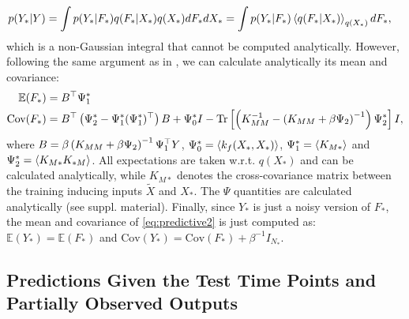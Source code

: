 \documentclass{article} %
\begin{document}
\begin{align} 
p(Y_*| Y) {}& =  \int p(Y_*| F_*)  q(F_*|X_*) q(X_*) d F_* d X_* = \int p(Y_* | F_*) \left\langle q(F_* | X_*) \right\rangle_{q(X_*)} d F_* , \label{eq:predictive2}
\end{align}
%
which is a non-Gaussian integral that cannot be computed analytically. However, following the same argument as in \cite{rasmussen-williams, Girard03gaussianprocess}, we can
calculate analytically its mean and covariance:
%
\begin{align}
 \mathbb{E}(F_*) ={}&  B^{\top} \Psi_1^* \label{meanFstar} \\
 \text{Cov}(F_*) ={}& B^{\top} \left( \Psi_2^* - \Psi_1^* (\Psi_1^*)^{\top} \right) B + \Psi_0^* I - \text{Tr} \left[ \left( K_{MM}^{-1} - \left( K_{MM} + \beta \Psi_2 \right)^{-1} \right) \Psi_2^* \right] I,
\end{align}
%
where $B = \beta \left( K_{MM} + \beta \Psi_2 \right)^{-1} \Psi_1^{\top}
Y$, $\Psi_0^* = \left\langle k_f(X_*, X_*) \right\rangle$, $\Psi_1^* = \left\langle K_{M*} \right\rangle$
and $\Psi_2^* = \left\langle K_{M*} K_{*M} \right\rangle$. All expectations are taken
w.r.t. $q(X_*)$ and can be calculated analytically, while $K_{M*}$
denotes the cross-covariance matrix between the training inducing
inputs $\tilde{X}$ and $X_*$. The $\Psi$ quantities are calculated analytically (see suppl. material). Finally, since $Y_*$ is just a noisy version of
$F_*$, the mean and covariance of \eqref{eq:predictive2} is just
computed as: $\mathbb{E}(Y_*) = \mathbb{E}(F_*)$ and $\text{Cov}(Y_*)
= \text{Cov}(F_*) + \beta^{-1} I_{N_*}$.
%


\subsection{Predictions Given the Test Time Points and Partially Observed Outputs}
\end{document}
